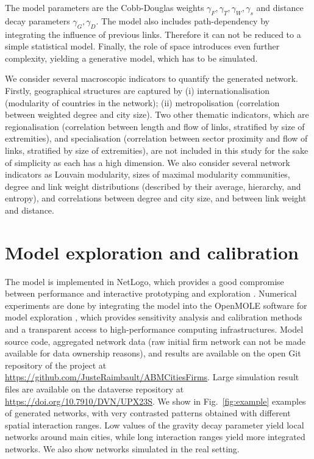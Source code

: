 \documentclass[11pt]{article}
\begin{document}
The model parameters are the Cobb-Douglas weights $\gamma_F,\gamma_T,\gamma_W,\gamma_s$ and distance decay parameters $\gamma_G,\gamma_D$. The model also includes path-dependency by integrating the influence of previous links. Therefore it can not be reduced to a simple statistical model. Finally, the role of space introduces even further complexity, yielding a generative model, which has to be simulated.

We consider several macroscopic indicators to quantify the generated network. Firstly, geographical structures are captured by (i) internationalisation (modularity of countries in the network); (ii) metropolisation (correlation between weighted degree and city size). Two other thematic indicators, which are regionalisation (correlation between length and flow of links, stratified by size of extremities), and specialisation (correlation between sector proximity and flow of links, stratified by size of extremities), are not included in this study for the sake of simplicity as each has a high dimension. We also consider several network indicators as Louvain modularity, sizes of maximal modularity communities, degree and link weight distributions (described by their average, hierarchy, and entropy), and correlations between degree and city size, and between link weight and distance.



\section{Model exploration and calibration}

The model is implemented in NetLogo, which provides a good compromise between performance and interactive prototyping and exploration \cite{railsback2017improving}. Numerical experiments are done by integrating the model into the OpenMOLE software for model exploration \cite{reuillon2013openmole}, which provides sensitivity analysis and calibration methods and a transparent access to high-performance computing infrastructures. Model source code, aggregated network data (raw initial firm network can not be made available for data ownership reasons), and results are available on the open Git repository of the project at \url{https://github.com/JusteRaimbault/ABMCitiesFirms}. Large simulation result files are available on the dataverse repository at \url{https://doi.org/10.7910/DVN/UPX23S}. We show in Fig.~\ref{fig:example} examples of generated networks, with very contrasted patterns obtained with different spatial interaction ranges. Low values of the gravity decay parameter yield local networks around main cities, while long interaction ranges yield more integrated networks. We also show networks simulated in the real setting.
\end{document}
